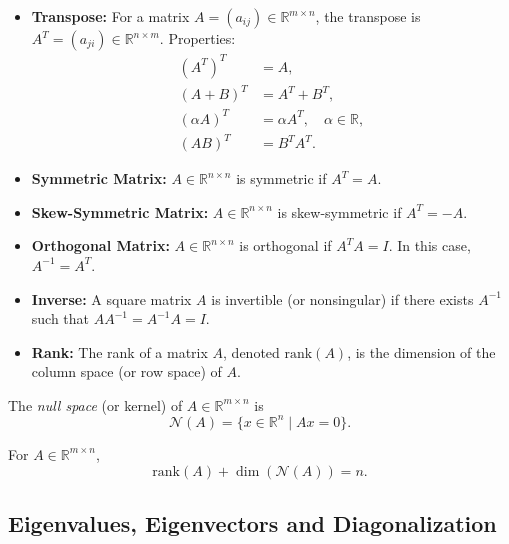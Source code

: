\begin{itemize}
    \item \textbf{Transpose:} For a matrix $A=(a_{ij}) \in \mathbb{R}^{m \times n}$, the transpose is $A^T=(a_{ji}) \in \mathbb{R}^{n \times m}$.  
    Properties:
    \begin{align*}
        (A^T)^T &= A, \\
        (A+B)^T &= A^T + B^T, \\
        (\alpha A)^T &= \alpha A^T, \quad \alpha \in \mathbb{R}, \\
        (AB)^T &= B^T A^T.
    \end{align*}
    
    \item \textbf{Symmetric Matrix:} $A \in \mathbb{R}^{n \times n}$ is symmetric if $A^T = A$.

    \item \textbf{Skew-Symmetric Matrix:} $A \in \mathbb{R}^{n \times n}$ is skew-symmetric if $A^T = -A$.

    \item \textbf{Orthogonal Matrix:} $A \in \mathbb{R}^{n \times n}$ is orthogonal if $A^T A = I$.  
    In this case, $A^{-1} = A^T$.

    \item \textbf{Inverse:} A square matrix $A$ is invertible (or nonsingular) if there exists $A^{-1}$ such that $AA^{-1}=A^{-1}A=I$.

    \item \textbf{Rank:} The rank of a matrix $A$, denoted $\mathrm{rank}(A)$, is the dimension of the column space (or row space) of $A$.
\end{itemize}

\begin{definition}
The \emph{null space} (or kernel) of $A \in \mathbb{R}^{m \times n}$ is
\[
\mathcal{N}(A) = \{x \in \mathbb{R}^n \mid Ax = 0\}.
\]
\end{definition}

\begin{theorem}
For $A \in \mathbb{R}^{m \times n}$,  
\[
\mathrm{rank}(A) + \dim(\mathcal{N}(A)) = n.
\]
\end{theorem}

\subsection{Eigenvalues, Eigenvectors and Diagonalization}

